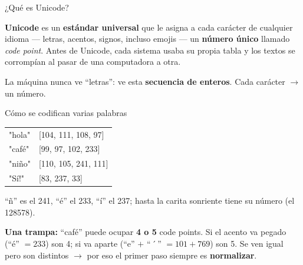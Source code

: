 \documentclass[aspectratio=169, 11pt]{beamer}
\begin{document}
\begin{frame}[shrink]{¿Qué es Unicode?}
  \begin{tcolorbox}[colback=arcaGray, colframe=arcaRed, leftrule=3pt, boxrule=0pt, sharp corners, left=8pt, right=8pt, top=6pt, bottom=6pt]
    {\small\color{arcaDark}
    \textbf{Unicode} es un \textbf{estándar universal} que le asigna a cada carácter de cualquier
    idioma --- letras, acentos, signos, incluso emojis --- un \textbf{número único} llamado
    \emph{code point}. Antes de Unicode, cada sistema usaba su propia tabla y los textos se
    corrompían al pasar de una computadora a otra.}
  \end{tcolorbox}
  \vspace{10pt}
  \begin{center}
  \end{center}
  \vspace{8pt}
  {\footnotesize\color{arcaDark}
  La máquina nunca ve ``letras'': ve esta \textbf{secuencia de enteros}. Cada carácter $\rightarrow$ un número.}
\end{frame}

\begin{frame}[shrink]{Cómo se codifican varias palabras}
  \begin{center}{\small\ttfamily
  \renewcommand{\arraystretch}{1.4}
  \begin{tabular}{l@{\quad$\rightarrow$\quad}l}
    "hola"  & [104, 111, 108, 97]\\
    "café"  & [99, 97, 102, 233]\\
    "niño"  & [110, 105, 241, 111]\\
    "Sí!"   & [83, 237, 33]\\
  \end{tabular}}
  \end{center}
  \vspace{4pt}
  {\footnotesize\color{arcaDark}
  ``ñ'' es el 241, ``é'' el 233, ``í'' el 237; hasta la carita sonriente tiene su número (el 128578).}
  \vspace{6pt}
  \begin{tcolorbox}[colback=arcaRed!8, colframe=arcaRed, leftrule=3pt, boxrule=0pt, sharp corners, left=8pt, right=8pt, top=4pt, bottom=4pt]
    {\footnotesize\color{arcaDark}
    \textbf{Una trampa:} ``café'' puede ocupar \textbf{4 o 5} code points. Si el acento va pegado
    (``é'' $=233$) son 4; si va aparte (``e'' $+$ ``\,´\,'' $=101+769$) son 5. Se ven igual pero son
    distintos $\rightarrow$ por eso el primer paso siempre es \textbf{normalizar}.}
  \end{tcolorbox}
\end{frame}
\end{document}
